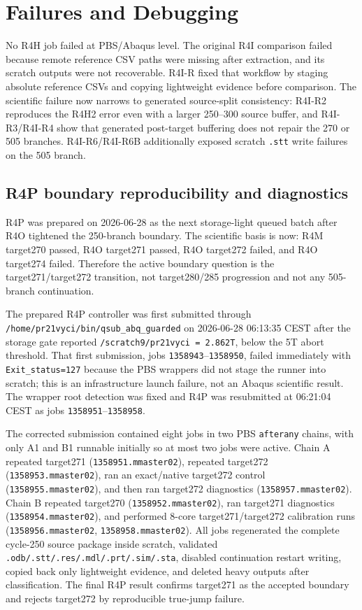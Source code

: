 \documentclass{article}
\begin{document}
\section{Failures and Debugging}
No R4H job failed at PBS/Abaqus level. The original R4I comparison failed because remote reference CSV paths were missing after extraction, and its scratch outputs were not recoverable. R4I-R fixed that workflow by staging absolute reference CSVs and copying lightweight evidence before comparison. The scientific failure now narrows to generated source-split consistency: R4I-R2 reproduces the R4H2 error even with a larger 250--300 source buffer, and R4I-R3/R4I-R4 show that generated post-target buffering does not repair the 270 or 505 branches. R4I-R6/R4I-R6B additionally exposed scratch \texttt{.stt} write failures on the 505 branch.

\subsection*{R4P boundary reproducibility and diagnostics}
R4P was prepared on 2026-06-28 as the next storage-light queued batch after R4O tightened the 250-branch boundary. The scientific basis is now: R4M target270 passed, R4O target271 passed, R4O target272 failed, and R4O target274 failed. Therefore the active boundary question is the target271/target272 transition, not target280/285 progression and not any 505-branch continuation.

The prepared R4P controller was first submitted through \texttt{/home/pr21vyci/bin/qsub\_abq\_guarded} on 2026-06-28 06:13:35 CEST after the storage gate reported \texttt{/scratch9/pr21vyci = 2.862T}, below the 5T abort threshold. That first submission, jobs \texttt{1358943}--\texttt{1358950}, failed immediately with \texttt{Exit\_status=127} because the PBS wrappers did not stage the runner into scratch; this is an infrastructure launch failure, not an Abaqus scientific result. The wrapper root detection was fixed and R4P was resubmitted at 06:21:04 CEST as jobs \texttt{1358951}--\texttt{1358958}.

The corrected submission contained eight jobs in two PBS \texttt{afterany} chains, with only A1 and B1 runnable initially so at most two jobs were active. Chain A repeated target271 (\texttt{1358951.mmaster02}), repeated target272 (\texttt{1358953.mmaster02}), ran an exact/native target272 control (\texttt{1358955.mmaster02}), and then ran target272 diagnostics (\texttt{1358957.mmaster02}). Chain B repeated target270 (\texttt{1358952.mmaster02}), ran target271 diagnostics (\texttt{1358954.mmaster02}), and performed 8-core target271/target272 calibration runs (\texttt{1358956.mmaster02}, \texttt{1358958.mmaster02}). All jobs regenerated the complete cycle-250 source package inside scratch, validated \texttt{.odb/.stt/.res/.mdl/.prt/.sim/.sta}, disabled continuation restart writing, copied back only lightweight evidence, and deleted heavy outputs after classification. The final R4P result confirms target271 as the accepted boundary and rejects target272 by reproducible true-jump failure.
\end{document}
